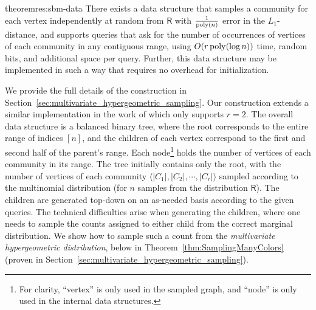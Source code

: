 \begin{restatable}{theorem}{res:sbm-data}\label{thm:sbm-data}
There exists a data structure that samples a community for each vertex independently at random from $\mathsf{R}$
with $\frac{1}{\mathrm{poly}(n)}$ error in the $L_1$-distance, and supports queries that ask for the number of occurrences of vertices of each community
in any contiguous range, using $O(r\,\mathrm{poly}(\log n))$ time, random bits, and additional space per query.
Further, this data structure may be implemented in such a way that requires no overhead for initialization.
\end{restatable}
\SBMGrand*

We provide the full details of the construction in Section~\ref{sec:multivariate_hypergeometric_sampling}.
Our construction extends a similar implementation in the work of \cite{huge} which only supports $r = 2$.
The overall data structure is a balanced binary tree, where the root corresponds to the entire range of indices $[n]$,
and the children of each vertex correspond to the first and second half of the parent's range.
Each node\footnote{For clarity, ``vertex'' is only used in the sampled graph, and ``node'' is only used in the internal data structures.}
holds the number of vertices of each community in its range.
The tree initially contains only the root, with the number of vertices of each community $\langle |C_1|, |C_2|,\cdots, |C_r| \rangle$
sampled according to the multinomial distribution (for $n$ samples from the distribution $\mathsf{R}$).
The children are generated top-down on an as-needed basis according to the given queries.
The technical difficulties arise when generating the children,
where one needs to sample the counts assigned to either child from the correct marginal distribution.
We show how to sample such a count from the \emph{multivariate hypergeometric distribution},
below in Theorem~\ref{thm:SamplingManyColors} (proven in Section~\ref{sec:multivariate_hypergeometric_sampling}).

